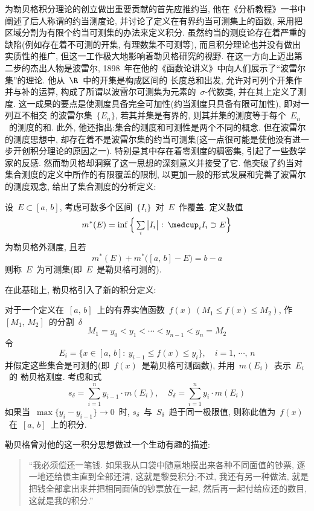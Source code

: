 为勒贝格积分理论的创立做出重要贡献的首先应推约当, 他在《分析教程》一书中阐述了后人称谓的约当测度论, 并讨论了定义在有界约当可测集上的函数, 采用把区域分割为有限个约当可测集的办法来定义积分. 虽然约当的测度论存在着严重的缺陷(例如存在着不可测的开集, 有理数集不可测等), 而且积分理论也并没有做出
实质性的推广, 但这一工作极大地影响着勒贝格研究的视野. 在这一方向上迈出第二步的杰出人物是波雷尔, 1898~年在他的《函数论讲义》中向人们展示了``波雷尔集''的理论. 他从~$\R$~中的开集是构成区间的
长度总和出发, 允许对可列个开集作并与补的运算, 构成了所谓以波雷尔可测集为元素的~$\sigma$-代数类, 并在其上定义了测度. 这一成果的要点是使测度具备完全可加性(约当测度只具备有限可加性), 即对一列互不相交
的波雷尔集~$\{E_n\}$, 若其并集是有界的, 则其并集的测度等于每个~$E_n$~的测度的和. 此外, 他还指出:集合的测度和可测性是两个不同的概念. 但在波雷尔的测度思想中, 却存在着不是波雷尔集的约当可测集(这一点很可能是使他没有进一步开创积分理论的原因之一). 特别是其中存在着零测度的稠密集, 引起了一些数学家的反感. 然而勒贝格却洞察了这一思想的深刻意义并接受了它. 他突破了约当对集合测度的定义中所作的有限覆盖的限制, 以更加一般的形式发展和完善了波雷尔的测度观念, 给出了集合测度的分析定义:

设~$E \subset [a,\,b]$, 考虑可数多个区间~$\{I_i\}$~对~$E$~作覆盖. 定义数值
\[
m^*(E)=\inf\Big\{ \mathop{\textstyle{\sum}}_i \big| I_i \big|: \: \medcup_i I_i \supset E \Big\}
\]
为勒贝格外测度, 且若
\[
m^*(E) + m^*\big( [a,\,b]-E \big) = b-a
\]
则称~$E$~为可测集(即~$E$~是勒贝格可测的).

在此基础上, 勒贝格引入了新的积分定义:

对于一个定义在~$[a,\,b]$~上的有界实值函数~$f(x)~(M_1 \leqslant f(x) \leqslant M_2)$, 作~$[M_1,\,M_2]$~的分割~$\delta$
\[
M_1 = y_0 < y_1 < \cdots < y_{n-1} < y_n = M_2
\]
令
\[
E_i = \big\{x \in [a,\,b]: \: y_{i-1} \leqslant f(x) \leqslant y_i \big\}, \quad i=1,\,\cdots,\,n
\]
并假定这些集合是可测的(即~$f(x)$~是勒贝格可测函数), 并用~$m(E_i)$~表示~$E_i$~的
勒贝格测度. 考虑和式
\[
s_\delta = \sum_{i=1}^n y_{i-1} \cdot m(E_i), \quad S_\delta = \sum_{i=1}^n y_i \cdot m(E_i)
\]
如果当~$\max\{y_i - y_{i-1}\} \to 0$~时, $s_\delta$~与~$S_\delta$~趋于同一极限值, 则称此值为~$f(x)$~在~$[a,\,b]$~上的积分.

勒贝格曾对他的这一积分思想做过一个生动有趣的描述:

\begin{quote}
``我必须偿还一笔钱. 如果我从口袋中随意地摸出来各种不同面值的钞票, 逐一地还给债主直到全部还清, 这就是黎曼积分;不过, 我还有另一种做法, 就是把钱全部拿出来并把相同面值的钞票放在一起, 然后再一起付给应还的数目, 这就是我的积分.''
\end{quote}


